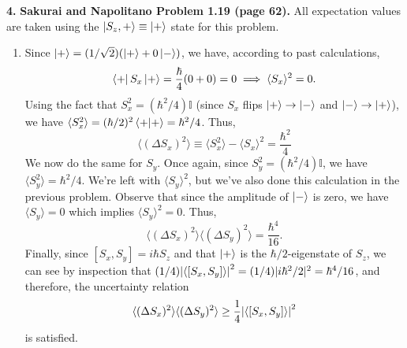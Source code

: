 \documentclass{article}
\theoremstyle{definition}
\newcommand{\f}[2]{\frac{#1}{#2}}
\begin{document}
\noindent \textbf{4.} \textbf{Sakurai and Napolitano Problem 1.19 (page 62).} All expectation values are taken using the $\ket{S_z, +} \equiv \ket{+}$ state for this problem.


\begin{enumerate}[label=(\alph*)]
	\item Since $\ket{+} = (1/\sqrt{2})(\ket{+} + 0 \ket{-})$, we have, according to past calculations,
	\begin{equation*}
	\bra{+} S_x \ket{+} = \f{\hbar}{4}(0+0) = 0 \implies \langle S_x \rangle^2 = 0.
	\end{equation*}
	Using the fact that $S_x^2 = (\hbar^2/4)\mathbb{I}$ (since $S_x$ flips $\ket{+}\to \ket{-}$ and $\ket{-} \to \ket{+}$), we have $\langle S_x^2 \rangle = (\hbar/2)^2 \braket{+} = \hbar^2/4$. Thus,
	\begin{equation*}
	\langle (\Delta S_x)^2\rangle \equiv \langle S_x^2\rangle - \langle S_x \rangle^2 = \boxed{\f{\hbar^2}{4}}
	\end{equation*}
	We now do the same for $S_y$. Once again, since $S_y^2 = (\hbar^2/4)\mathbb{I}$, we have $\langle S_y^2 \rangle = \hbar^2/4$. We're left with $\langle S_y \rangle^2$, but we've also done this calculation in the previous problem.  Observe that since the amplitude of $\ket{-}$ is zero, we have $\langle S_y \rangle = 0$ which implies $\langle S_y \rangle^2 = 0$. Thus, 
	\begin{equation*}
	\langle (\Delta S_x)^2\rangle \langle (\Delta S_y)^2\rangle = {\f{\hbar^4}{16}}.
	\end{equation*}
	Finally, since $[S_x, S_y] = i\hbar S_z$ and that $\ket{+}$ is the $\hbar/2$-eigenstate of $S_z$, we can see by inspection that $(1/4)\abs{\langle [S_x, S_y] \rangle}^2 = (1/4)|i\hbar^2/2|^2 = \hbar^4/16$, and therefore, the uncertainty relation 
	\begin{equation*}
	\langle (\Delta S_x)^2\rangle \langle (\Delta S_y)^2\rangle \geq  \f{1}{4}\abs{\langle [S_x, S_y] \rangle}^2
	\end{equation*}
	is satisfied. 
	
	
	

\end{enumerate}
\end{document}
